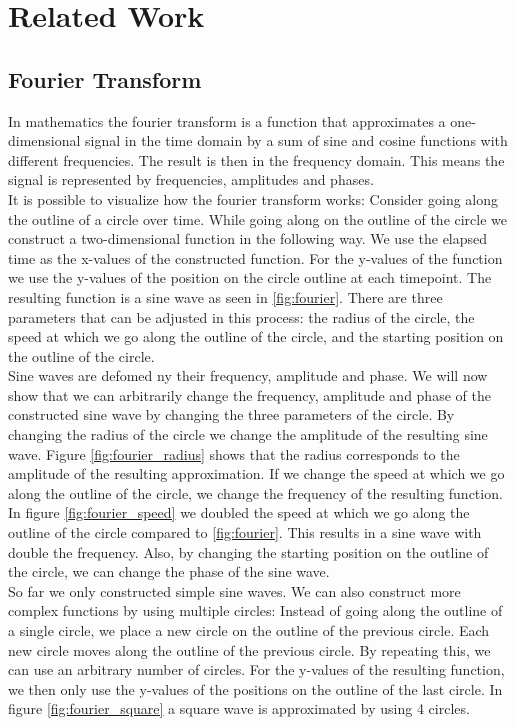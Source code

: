 \documentclass[thesis.tex]{subfiles}
\begin{document}
\chapter{Related Work}
\section{Fourier Transform}

In mathematics the fourier transform is a function that approximates a one-dimensional signal in the time domain by a sum of sine and cosine functions with different frequencies. The result is then in the frequency domain. This means the signal is represented by frequencies, amplitudes and phases.
\\ 
It is possible to visualize how the fourier transform works: Consider going along the outline of a circle over time. While going along on the outline of the circle we construct a two-dimensional function in the following way. We use the elapsed time as the x-values of the constructed function. For the y-values of the function we use the y-values of the position on the circle outline at each timepoint. The resulting function is a sine wave as seen in \ref{fig:fourier}. There are three parameters that can be adjusted in this process: the radius of the circle, the speed at which we go along the outline of the circle, and the starting position on the outline of the circle. \\
Sine waves are defomed ny their frequency, amplitude and phase. We will now show that we can arbitrarily change the frequency, amplitude and phase of the constructed sine wave by changing the three parameters of the circle. By changing the radius of the circle we change the amplitude of the resulting sine wave. Figure \ref{fig:fourier_radius} shows that the radius corresponds to the amplitude of the resulting approximation. If we change the speed at which we go along the outline of the circle, we change the frequency of the resulting function. In figure \ref{fig:fourier_speed} we doubled the speed at which we go along the outline of the circle compared to \ref{fig:fourier}. This results in a sine wave with double the frequency. Also, by changing the starting position on the outline of the circle, we can change the phase of the sine wave.\\
So far we only constructed simple sine waves. We can also construct more complex functions by using multiple circles: Instead of going along the outline of a single circle, we place a new circle on the outline of the previous circle. Each new circle moves along the outline of the previous circle. By repeating this, we can use an arbitrary number of circles. For the y-values of the resulting function, we then only use the y-values of the positions on the outline of the last circle. In figure \ref{fig:fourier_square} a square wave is approximated by using 4 circles. 
\end{document}
